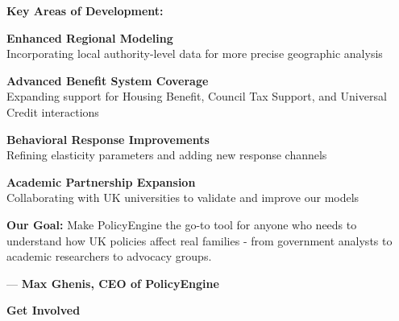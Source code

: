 \documentclass[a4paper,11pt]{article}
\newcommand{\highlightbox}[1]{%
    \begin{tcolorbox}[
        colback=lightblue,
        colframe=darkblue,
        leftrule=4mm,
        rightrule=0mm,
        toprule=0mm,
        bottomrule=0mm,
        sharp corners
    ]
    #1
    \end{tcolorbox}
}
\begin{document}
\vspace{15pt}

\textbf{Key Areas of Development:}

\begin{tcolorbox}[colback=lightgray, colframe=lightgray, rounded corners]
\textbf{Enhanced Regional Modeling} \\
Incorporating local authority-level data for more precise geographic analysis
\end{tcolorbox}

\vspace{10pt}

\begin{tcolorbox}[colback=lightgray, colframe=lightgray, rounded corners]
\textbf{Advanced Benefit System Coverage} \\
Expanding support for Housing Benefit, Council Tax Support, and Universal Credit interactions
\end{tcolorbox}

\vspace{10pt}

\begin{tcolorbox}[colback=lightgray, colframe=lightgray, rounded corners]
\textbf{Behavioral Response Improvements} \\
Refining elasticity parameters and adding new response channels
\end{tcolorbox}

\vspace{10pt}

\begin{tcolorbox}[colback=lightgray, colframe=lightgray, rounded corners]
\textbf{Academic Partnership Expansion} \\
Collaborating with UK universities to validate and improve our models
\end{tcolorbox}

\vspace{20pt}

\highlightbox{
\textbf{Our Goal:} Make PolicyEngine the go-to tool for anyone who needs to understand how UK policies affect real families - from government analysts to academic researchers to advocacy groups.

\vspace{10pt}

\hfill — \textbf{Max Ghenis, CEO of PolicyEngine}
}

\vspace{20pt}

\textbf{Get Involved}
\end{document}
